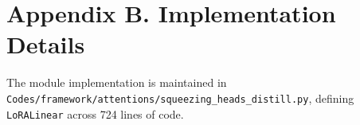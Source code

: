 \section*{Appendix B. Implementation Details}
The module implementation is maintained in \texttt{Codes/framework/attentions/squeezing\_heads\_distill.py}, defining \texttt{LoRALinear} across 724 lines of code.
